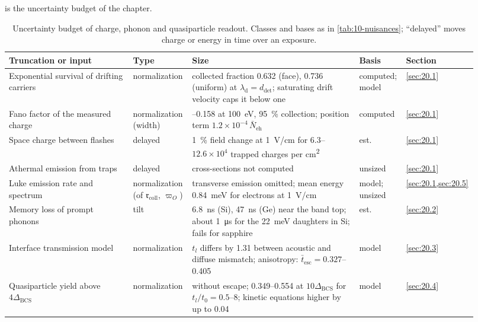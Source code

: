  is the uncertainty budget of the chapter.
\begin{table}[tbp]
  \caption{Uncertainty budget of charge, phonon and quasiparticle readout. Classes and bases as in \cref{tab:10-nuisances}; ``delayed'' moves charge or energy in time over an exposure.}
  \label{tab:20-nuisances}
  \centering\scriptsize\setlength{\tabcolsep}{3pt}
  \begin{tabular}{@{}>{\raggedright\arraybackslash}p{0.26\linewidth}>{\raggedright\arraybackslash}p{0.12\linewidth}>{\raggedright\arraybackslash}p{0.35\linewidth}>{\raggedright\arraybackslash}p{0.09\linewidth}>{\raggedright\arraybackslash}p{0.10\linewidth}@{}}
    \toprule
    Truncation or input & Type & Size & Basis & Section \\
    \midrule
    Exponential survival of drifting carriers & normali\-zation & collected fraction 0.632 (face), 0.736 (uniform) at $\lambda_{\mathrm{d}} = d_{\mathrm{det}}$; saturating drift velocity caps it below one & computed; model & \cref{sec:20.1} \\
    Fano factor of the measured charge & normali\-zation (width) & 0.125--0.158 at \SI{100}{eV}, \SI{95}{\percent} collection; position term $1.2\times10^{-4}\,\bar N_{\mathrm{eh}}$ & computed & \cref{sec:20.1} \\
    Space charge between flashes & delayed & \SI{1}{\percent} field change at \SI{1}{V/cm} for 6.3--$12.6\times10^4$ trapped charges per \si{cm^2} & est. & \cref{sec:20.1} \\
    Athermal emission from traps & delayed & cross-sections not computed & unsized & \cref{sec:20.1} \\
    Luke emission rate and spectrum & normali\-zation (of $\mathfrak{r}_{\mathrm{coll}}$, $\varpi_O$) & transverse emission omitted; mean energy \SI{0.84}{meV} for electrons at \SI{1}{V/cm} & model; unsized & \cref{sec:20.1,sec:20.5} \\
    Memory loss of prompt phonons & tilt & \SI{6.8}{ns} (Si), \SI{47}{ns} (Ge) near the band top; about \SI{1}{\micro s} for the \SI{22}{meV} daughters in Si; fails for sapphire & est. & \cref{sec:20.2} \\
    Interface transmission model & normali\-zation & $t_l$ differs by 1.31 between acoustic and diffuse mismatch; anisotropy: $\bar t_{\mathrm{esc}} = 0.327$--0.405 & model & \cref{sec:20.3} \\
    Quasiparticle yield above $4\Delta_{\mathrm{BCS}}$ & normali\-zation & 0.590 without escape; 0.349--0.554 at $10\Delta_{\mathrm{BCS}}$ for $t_l/t_0 = 0.5$--8; kinetic equations higher by up to 0.04 & model & \cref{sec:20.4} \\

\end{tabular}
\end{table}
